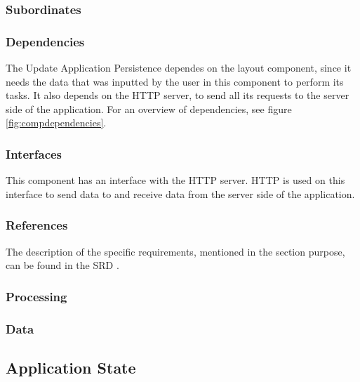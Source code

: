 \subsubsection*{Subordinates}

\subsubsection*{Dependencies}
The Update Application Persistence dependes on the layout component, since it needs the data that was inputted by the user in this component to perform its tasks. It also depends on the HTTP server, to send all its requests to the server side of the application. For an overview of dependencies, see figure \ref{fig:compdependencies}.

\subsubsection*{Interfaces}
This component has an interface with the HTTP server. HTTP is used on this interface to send data to and receive data from the server side of the application. 

\subsubsection*{References}
The description of the specific requirements, mentioned in the section purpose, can be found in the SRD \cite{srd}.

\subsubsection*{Processing}

\subsubsection*{Data}

\subsection{Application State}
\label{subsec:appstate}

